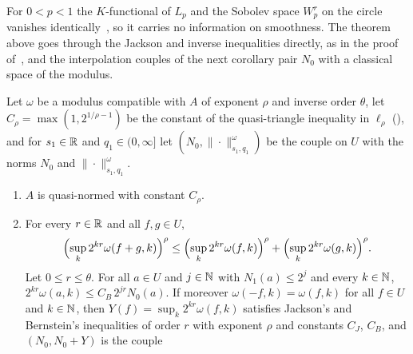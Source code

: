 For $0 < p < 1$ the $K$-functional of $L_p$ and the Sobolev space $W^r_p$ on the circle
vanishes identically~\cite{DitzianHristovIvanov1995}, so it carries no information on
smoothness. The theorem above goes through the Jackson and inverse inequalities directly, as in
the proof of~\cite[Theorem~4.8]{DeVorePopovTAMS}, and the interpolation couples of the next
corollary pair $N_0$ with a classical space of the modulus.

\begin{corollary}
\label{cor:couple-modulus-interpolate}
\leanok
{}
Let $\omega$ be a modulus compatible with $A$ of exponent $\rho$ and inverse order $\theta$, let
$C_\rho = \max(1, 2^{1/\rho - 1})$ be the constant of the quasi-triangle inequality in
$\ell_\rho$ (), and for $s_1 \in \mathbb{R}$ and
$q_1 \in (0, \infty]$ let $(N_0, \|\cdot\|^{\omega}_{s_1, q_1})$ be the couple on $U$ with the
norms $N_0$ and $\|\cdot\|^{\omega}_{s_1, q_1}$.
\begin{enumerate}
  \item $A$ is quasi-normed with constant $C_\rho$.
  \item For every $r \in \mathbb{R}$ and all $f, g \in U$,
    \[
      \Bigl(\sup_k 2^{kr} \omega(f + g, k)\Bigr)^\rho \leq
      \Bigl(\sup_k 2^{kr} \omega(f, k)\Bigr)^\rho + \Bigl(\sup_k 2^{kr} \omega(g, k)\Bigr)^\rho .
    \]
    Let $0 \leq r \leq \theta$. For all $a \in U$ and $j \in \mathbb{N}$ with $N_1(a) \leq 2^j$ and
    every $k \in \mathbb{N}$, $2^{kr} \omega(a, k) \leq C_B \, 2^{jr} N_0(a)$.
    If moreover $\omega(-f, k) = \omega(f, k)$ for all $f \in U$ and $k \in \mathbb{N}$, then
    $Y(f) = \sup_k 2^{kr} \omega(f, k)$ satisfies Jackson's and Bernstein's inequalities of
    order $r$ with exponent $\rho$ and constants $C_J$, $C_B$, and $(N_0, N_0 + Y)$ is the couple

\end{enumerate}
\end{corollary}
